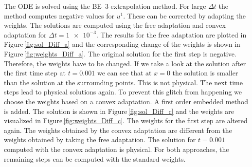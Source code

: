 \documentclass[a4paper]{article}
\numberwithin{equation}{section}
\theoremstyle{plain}
\theoremstyle{definition}
\numberwithin{theorem}{section}
\newcommand{\dt}{{\Delta t}}
\newcommand{\1}{\mathbbm{1}}
\begin{document}
The ODE is solved using the BE~3 extrapolation method.
For large $\dt$ the method computes negative values for $u^1$.
These can be corrected by adapting the weights.
The solutions are computed using the free adaptation and convex adaptation for $\dt = \num{1e-3}$.
The results for the free adaptation are plotted in Figure\,\ref{fig:sol_Diff_a} and the corresponding change of the weights
is shown in Figure\,\ref{fig:weights_Diff_a}.
The original solution for the first step is negative. Therefore, the weights have to be changed.
If we take a look at the solution after the first time step at $t=0.001$ we can see that at $x=0$ the solution is smaller than the solution at the surrounding points.
This is not physical.
The next time steps lead to physical solutions again.
To prevent this glitch from happening we choose the weights based on a convex adaptation.
A first order embedded method is added. The solution is shown in Figure\,\ref{fig:sol_Diff_c} and the weights are visualized in Figure\,\ref{fig:weights_Diff_c}.
The weights for the first step are altered again.
The weights obtained by the convex adaptation are different from the weights obtained
by taking the free adaptation.
The solution for $t=0.001$ computed with the convex adaptation is physical.
For both approaches, the remaining steps can be computed with the standard weights.
\end{document}
